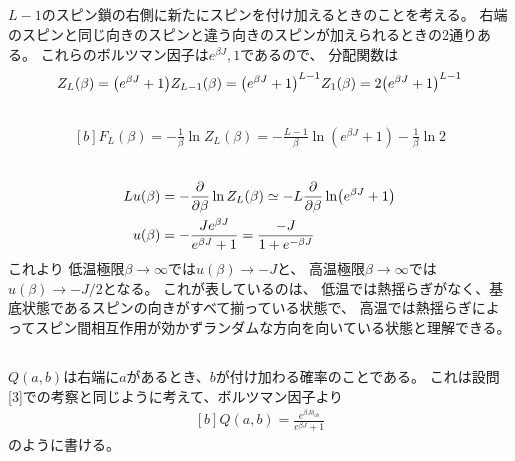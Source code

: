 \documentclass[../../sp_2018.tex]{subfiles}
\begin{document}
\subsection{}
\(L-1\)のスピン鎖の右側に新たにスピンを付け加えるときのことを考える。
右端のスピンと同じ向きのスピンと違う向きのスピンが加えられるときの2通りある。
これらのボルツマン因子は\(e^{\beta J},1\)であるので、
分配関数は
\begin{equation}\begin{aligned}[b]
    Z_L(\beta) = \qty(e^{\beta J}+1)Z_{L-1}(\beta)=\qty(e^{\beta J}+1)^{L-1}Z_1(\beta)=2\qty(e^{\beta J}+1)^{L-1}
\end{aligned}\end{equation}

\subsection{}
\begin{equation}\begin{aligned}[b]
    F_L(\beta)=-\frac{1}{\beta}\ln Z_L(\beta) = -\frac{L-1}{\beta}\ln(e^{\beta J}+1)-\frac{1}{\beta}\ln2
\end{aligned}\end{equation}

\subsection{}
\begin{equation}\begin{aligned}[b]
    Lu(\beta) &= -\pdv{\beta}\ln Z_L(\beta) \simeq -L\pdv{\beta}\ln(e^{\beta J}+1)\\
    u(\beta) &= -\frac{Je^{\beta J}}{e^{\beta J}+1} = \frac{-J}{1+e^{-\beta J}}
\end{aligned}\end{equation}
これより
低温極限\(\beta\to\infty\)では\(u(\beta)\to-J\)と、
高温極限\(\beta\to\infty\)では\(u(\beta)\to-J/2\)となる。
これが表しているのは、
低温では熱揺らぎがなく、基底状態であるスピンの向きがすべて揃っている状態で、
高温では熱揺らぎによってスピン間相互作用が効かずランダムな方向を向いている状態と理解できる。

\subsection{}
\(Q(a,b)\)は右端に\(a\)があるとき、\(b\)が付け加わる確率のことである。
これは設問[3]での考察と同じように考えて、ボルツマン因子より
\begin{equation}\begin{aligned}[b]
    Q(a,b)=\frac{e^{\beta J \delta_{ab}}}{e^{\beta J}+1}
\end{aligned}\end{equation}
のように書ける。
\end{document}
